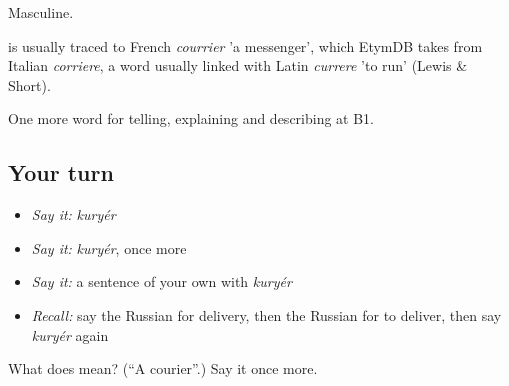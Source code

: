 Masculine.

\begin{cousinweb}
\emph{} is usually traced to French \emph{courrier} 'a messenger', which EtymDB takes from Italian \emph{corriere}, a word usually linked with Latin \emph{currere} 'to run' (Lewis \& Short).
\end{cousinweb}

\begin{grammarlens}[title={What you've built}]
One more word for telling, explaining and describing at B1.
\end{grammarlens}

\subsection*{Your turn}
\begin{itemize}
\raggedright
  \item \emph{Say it:} \emph{kuryér}
  \item \emph{Say it:} \emph{kuryér}, once more
  \item \emph{Say it:} a sentence of your own with \emph{kuryér}
  \item \emph{Recall:} say the Russian for delivery, then the Russian for to deliver, then say \emph{kuryér} again
\end{itemize}

\begin{tcolorbox}[breakable,colback=teal!4,colframe=teal!35!black,title={Before you move on}]
What does  mean? (\textquotedblleft{}A courier\textquotedblright{}.) Say it once more.
\end{tcolorbox}
